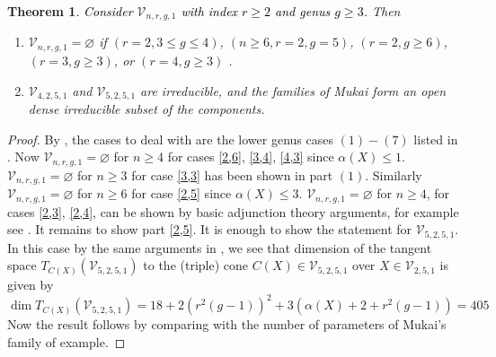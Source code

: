 \documentclass[11pt,twoside]{amsart}
\theoremstyle{plain}
\numberwithin{equation}{section}
\newtheorem{theorem}{Theorem}[section]
\theoremstyle{definition}
\begin{document}
\color{black}

\begin{theorem}\label{classification of Mukai varieties with index two}
\textcolor{black}{Consider} $\mathcal{V}_{n,r,g,1}$ \textcolor{black}{with index $r \geq 2$ and genus $g \geq 3$.} Then 
\begin{enumerate}
    \item $\mathcal{V}_{n,r,g,1} = \varnothing$ if $(r = 2, 3 \leq g \leq 4)$, $(n \geq 6, r = 2, g = 5)$, $(r = 2, g \geq 6)$, $(r = 3, g \geq 3)$, or $(r = 4, g \geq 3)$ . 
    \item $\mathcal{V}_{4,2,5,1}$ and $\mathcal{V}_{5,2,5,1}$ are irreducible, and the families of Mukai form an open dense irreducible subset of the components.
\end{enumerate}
\end{theorem}

\begin{proof}
   By , the cases to deal with are the lower genus cases $(1)-(7)$  listed in . Now $\mathcal{V}_{n,r,g,1} = \varnothing$ for $n \geq 4$ for cases \ref{2,6}, \ref{3,4}, \ref{4,3} since $\alpha(X) \leq 1$. $\mathcal{V}_{n,r,g,1} = \varnothing$ for $n \geq 3$ for case \ref{3,3} has been shown in  part $(1)$. Similarly $\mathcal{V}_{n,r,g,1} = \varnothing$ for $n \geq 6$ for case \ref{2,5} since $\alpha(X) \leq 3$.  $\mathcal{V}_{n,r,g,1} = \varnothing$ for $n \geq 4$, for cases \ref{2,3}, \ref{2,4}, can be shown by basic adjunction theory arguments, for example see \cite[Theorem $3.11$]{CLM98}. It remains to show part \ref{2,5}. It is enough to show the statement for $\mathcal{V}_{5,2,5,1}$. In this case by the same arguments in , we see that dimension of the tangent space $T_{C(X)}(\mathcal{V}_{5,2,5,1})$ to the (triple) cone $C(X) \in \mathcal{V}_{5,2,5,1}$ over $X \in \mathcal{V}_{2,5,1}$ is given by 
   $$\operatorname{dim}T_{C(X)}(\mathcal{V}_{5,2,5,1}) = 18+2(r^2(g-1))^2+3(\alpha(X)+2+r^2(g-1)) = 405$$
   Now the result follows by comparing with the number of parameters of Mukai's family of example.


\end{proof}
\end{document}
